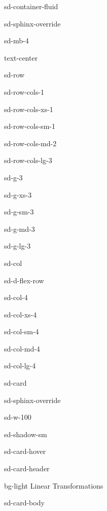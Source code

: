 \documentclass[letterpaper,10pt,english]{jupyterBook}
\let\sphinxpxdimen\pdfpxdimen\else\newdimen\sphinxpxdimen
\begin{document}
\begin{sphinxuseclass}{sd-container-fluid}
\begin{sphinxuseclass}{sd-sphinx-override}
\begin{sphinxuseclass}{sd-mb-4}
\begin{sphinxuseclass}{text-center}
\begin{sphinxuseclass}{sd-row}
\begin{sphinxuseclass}{sd-row-cols-1}
\begin{sphinxuseclass}{sd-row-cols-xs-1}
\begin{sphinxuseclass}{sd-row-cols-sm-1}
\begin{sphinxuseclass}{sd-row-cols-md-2}
\begin{sphinxuseclass}{sd-row-cols-lg-3}
\begin{sphinxuseclass}{sd-g-3}
\begin{sphinxuseclass}{sd-g-xs-3}
\begin{sphinxuseclass}{sd-g-sm-3}
\begin{sphinxuseclass}{sd-g-md-3}
\begin{sphinxuseclass}{sd-g-lg-3}
\begin{sphinxuseclass}{sd-col}
\begin{sphinxuseclass}{sd-d-flex-row}
\begin{sphinxuseclass}{sd-col-4}
\begin{sphinxuseclass}{sd-col-xs-4}
\begin{sphinxuseclass}{sd-col-sm-4}
\begin{sphinxuseclass}{sd-col-md-4}
\begin{sphinxuseclass}{sd-col-lg-4}
\begin{sphinxuseclass}{sd-card}
\begin{sphinxuseclass}{sd-sphinx-override}
\begin{sphinxuseclass}{sd-w-100}
\begin{sphinxuseclass}{sd-shadow-sm}
\begin{sphinxuseclass}{sd-card-hover}
\begin{sphinxuseclass}{sd-card-header}
\begin{sphinxuseclass}{bg-light}
\sphinxAtStartPar
Linear Transformations

\end{sphinxuseclass}
\end{sphinxuseclass}
\begin{sphinxuseclass}{sd-card-body}
\begin{figure}[htbp]
\centering

\noindent\sphinxincludegraphics[width=250\sphinxpxdimen]{{6_linear_transformation}.png}
\end{figure}

\end{sphinxuseclass}{\hyperref[\detokenize{_pages/6.0_Linear_transformations::doc}]{}}
\end{sphinxuseclass}
\end{sphinxuseclass}
\end{sphinxuseclass}
\end{sphinxuseclass}
\end{sphinxuseclass}
\end{sphinxuseclass}
\end{sphinxuseclass}
\end{sphinxuseclass}
\end{sphinxuseclass}
\end{sphinxuseclass}
\end{sphinxuseclass}
\end{sphinxuseclass}
\end{sphinxuseclass}
\end{sphinxuseclass}
\end{sphinxuseclass}
\end{sphinxuseclass}
\end{sphinxuseclass}
\end{sphinxuseclass}
\end{sphinxuseclass}
\end{sphinxuseclass}
\end{sphinxuseclass}
\end{sphinxuseclass}
\end{sphinxuseclass}

\end{sphinxuseclass}
\end{sphinxuseclass}
\end{sphinxuseclass}
\end{sphinxuseclass}
\end{document}
